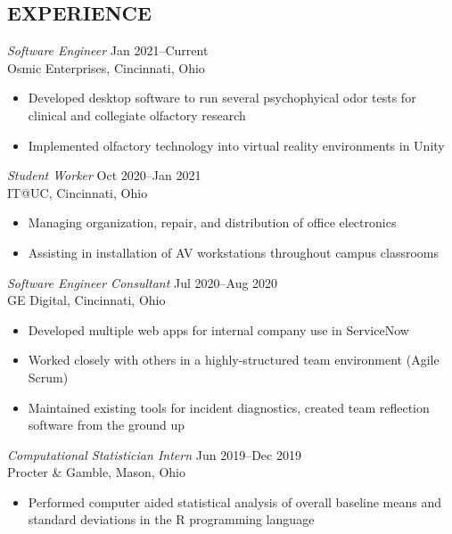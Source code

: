 \documentclass[margin, 10pt]{res} %
\begin{document}
\begin{resume}
 
 
\section{EXPERIENCE}

{\sl Software Engineer} \hfill {\color{gray} Jan 2021–Current}  \\
Osmic Enterprises, Cincinnati, Ohio 
\begin{itemize} \itemsep -2pt %
\item Developed desktop software to run several psychophyical odor tests for clinical and collegiate olfactory research
\item Implemented olfactory technology into virtual reality environments in Unity
\end{itemize}

{\sl Student Worker} \hfill {\color{gray} Oct 2020–Jan 2021}  \\
IT@UC, Cincinnati, Ohio 
\begin{itemize} \itemsep -2pt %
\item Managing organization, repair, and distribution of office electronics
\item Assisting in installation of AV workstations throughout campus classrooms
\end{itemize}
 
{\sl Software Engineer Consultant} \hfill {\color{gray} Jul 2020–Aug 2020} \\
GE Digital, Cincinnati, Ohio
\begin{itemize} 
\item Developed multiple web apps for internal company use in ServiceNow
\item Worked closely with others in a highly-structured team environment (Agile Scrum)
\item Maintained existing tools for incident diagnostics, created team reflection software from the ground up
\end{itemize} 

{\sl Computational Statistician Intern} \hfill {\color{gray} Jun 2019–Dec 2019} \\
Procter \& Gamble, Mason, Ohio
\begin{itemize}
\item Performed computer aided statistical analysis of overall baseline means and standard deviations in the R programming language
\end{itemize}


\end{resume}
\end{document}

